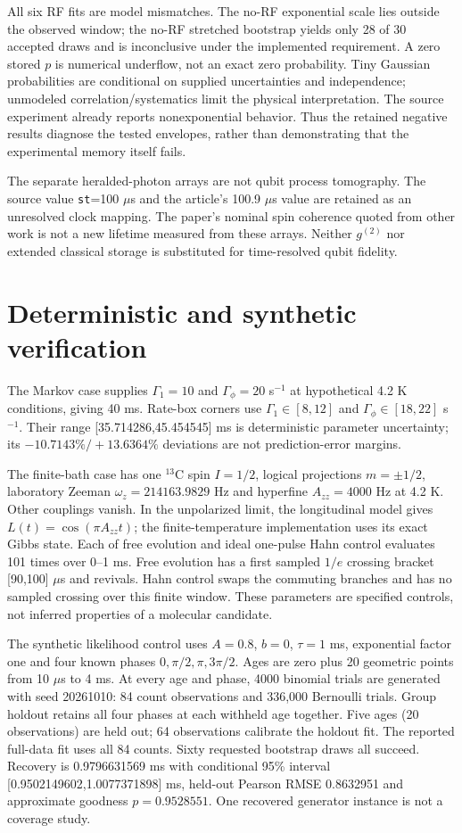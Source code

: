 \documentclass[10pt,a4paper]{article}
\newcommand{\code}[1]{\texttt{#1}}
\begin{document}
All six RF fits are model mismatches. The no-RF exponential scale lies outside the observed window; the no-RF stretched bootstrap yields only 28 of 30 accepted draws and is inconclusive under the implemented requirement. A zero stored $p$ is numerical underflow, not an exact zero probability. Tiny Gaussian probabilities are conditional on supplied uncertainties and independence; unmodeled correlation/systematics limit the physical interpretation. The source experiment already reports nonexponential behavior. Thus the retained negative results diagnose the tested envelopes, rather than demonstrating that the experimental memory itself fails.

The separate heralded-photon arrays are not qubit process tomography. The source value \code{st}=100 $\mu$s and the article's 100.9 $\mu$s value are retained as an unresolved clock mapping. The paper's nominal spin coherence quoted from other work is not a new lifetime measured from these arrays. Neither $g^{(2)}$ nor extended classical storage is substituted for time-resolved qubit fidelity.

\section{Deterministic and synthetic verification}
The Markov case supplies $\Gamma_1=10$ and $\Gamma_\phi=20$ s$^{-1}$ at hypothetical 4.2 K conditions, giving 40 ms. Rate-box corners use $\Gamma_1\in[8,12]$ and $\Gamma_\phi\in[18,22]$ s$^{-1}$. Their range [35.714286,45.454545] ms is deterministic parameter uncertainty; its $-10.7143\%/+13.6364\%$ deviations are not prediction-error margins.

The finite-bath case has one $^{13}$C spin $I=1/2$, logical projections $m=\pm1/2$, laboratory Zeeman $\omega_z=214163.9829$ Hz and hyperfine $A_{zz}=4000$ Hz at 4.2 K. Other couplings vanish. In the unpolarized limit, the longitudinal model gives $L(t)=\cos(\pi A_{zz}t)$; the finite-temperature implementation uses its exact Gibbs state. Each of free evolution and ideal one-pulse Hahn control evaluates 101 times over 0--1 ms. Free evolution has a first sampled $1/e$ crossing bracket [90,100] $\mu$s and revivals. Hahn control swaps the commuting branches and has no sampled crossing over this finite window. These parameters are specified controls, not inferred properties of a molecular candidate.

The synthetic likelihood control uses $A=0.8$, $b=0$, $\tau=1$ ms, exponential factor one and four known phases $0,\pi/2,\pi,3\pi/2$. Ages are zero plus 20 geometric points from 10 $\mu$s to 4 ms. At every age and phase, 4000 binomial trials are generated with seed 20261010: 84 count observations and 336,000 Bernoulli trials. Group holdout retains all four phases at each withheld age together. Five ages (20 observations) are held out; 64 observations calibrate the holdout fit. The reported full-data fit uses all 84 counts. Sixty requested bootstrap draws all succeed. Recovery is 0.9796631569 ms with conditional 95\% interval [0.9502149602,1.0077371898] ms, held-out Pearson RMSE 0.8632951 and approximate goodness $p=0.9528551$. One recovered generator instance is not a coverage study.
\end{document}
